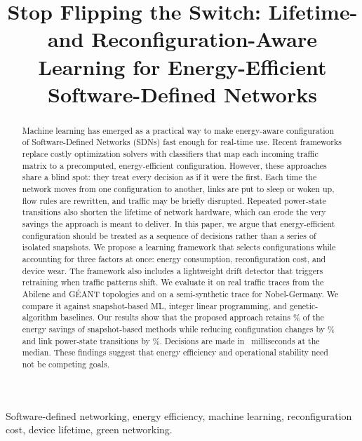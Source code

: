 \documentclass[conference]{IEEEtran}
\begin{document}
\title{Stop Flipping the Switch: Lifetime- and Reconfiguration-Aware Learning for Energy-Efficient Software-Defined Networks}

\author{}

\maketitle

\begin{abstract}
Machine learning has emerged as a practical way to make energy-aware configuration of Software-Defined Networks (SDNs) fast enough for real-time use. Recent frameworks replace costly optimization solvers with classifiers that map each incoming traffic matrix to a precomputed, energy-efficient configuration. However, these approaches share a blind spot: they treat every decision as if it were the first. Each time the network moves from one configuration to another, links are put to sleep or woken up, flow rules are rewritten, and traffic may be briefly disrupted. Repeated power-state transitions also shorten the lifetime of network hardware, which can erode the very savings the approach is meant to deliver. In this paper, we argue that energy-efficient configuration should be treated as a sequence of decisions rather than a series of isolated snapshots. We propose a learning framework that selects configurations while accounting for three factors at once: energy consumption, reconfiguration cost, and device wear. The framework also includes a lightweight drift detector that triggers retraining when traffic patterns shift. We evaluate it on real traffic traces from the Abilene and G\'{E}ANT topologies and on a semi-synthetic trace for Nobel-Germany. We compare it against snapshot-based ML, integer linear programming, and genetic-algorithm baselines. Our results show that the proposed approach retains \resRetention\% of the energy savings of snapshot-based methods while reducing configuration changes by \resChangeRed\% and link power-state transitions by \resTransRed\%. Decisions are made in \resLatency\ milliseconds at the median. These findings suggest that energy efficiency and operational stability need not be competing goals.
\end{abstract}

\begin{IEEEkeywords}
Software-defined networking, energy efficiency, machine learning, reconfiguration cost, device lifetime, green networking.
\end{IEEEkeywords}
\end{document}
